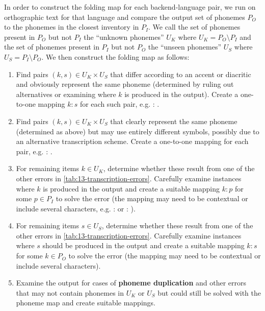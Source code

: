 In order to construct the folding map for each backend-language pair, we run \gpp on orthographic text for that language and compare the output set of phonemes $P_O$ to the phonemes in the closest inventory in \phoible $P_I$. We call the set of phonemes present in $P_O$ but not $P_I$ the ``unknown phonemes'' $U_K$ where $U_K = P_O \setminus P_I $ and the set of phonemes present in $P_I$ but not $P_O$ the ``unseen phonemes'' $U_S$ where $U_S = P_I \setminus P_O $. We then construct the folding map as follows:
\begin{enumerate}
    \item Find pairs $(k,s) \in U_K \times U_S$ that differ according to an accent or diacritic and obviously represent the same phoneme (determined by ruling out alternatives or examining where $k$ is produced in the output). Create a one-to-one mapping $k:s$ for each such pair, e.g.  : .
    \item Find pairs $(k,s) \in U_K \times U_S$ that clearly represent the same phoneme (determined as above) but may use entirely different symbols, possibly due to an alternative transcription scheme. Create a one-to-one mapping for each pair, e.g.  : \ttipa{\ae}.
    \item For remaining items $k \in U_K$, determine whether these result from one of the other errors in \cref{tab:13-transcription-errors}. Carefully examine instances where $k$ is produced in the output and create a suitable mapping $k : p$ for some $p \in P_I$ to solve the error (the mapping may need to be contextual or include several characters, e.g. \ttipa{\textrhookschwa} :  or  : ). 
    \item For remaining items $s \in U_S$, determine whether these result from one of the other errors in \cref{tab:13-transcription-errors}. Carefully examine instances where $s$ should be produced in the output and create a suitable mapping $k : s$ for some $k \in P_O$ to solve the error (the mapping may need to be contextual or include several characters). 
    \item Examine the output for cases of \textbf{phoneme duplication} and other errors that may not contain phonemes in $U_K$ or $U_S$ but could still be solved with the phoneme map and create suitable mappings.
\end{enumerate}

